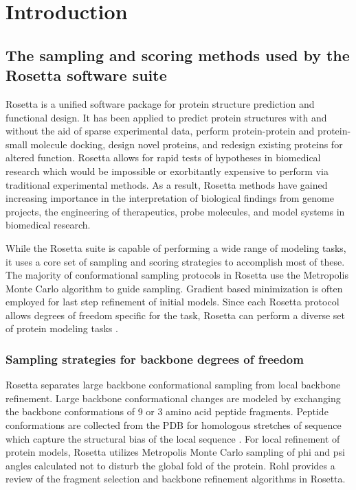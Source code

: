 \chapter{Introduction}
\label{chap:introduction}
\section{The sampling and scoring methods used by the Rosetta software suite}
\label{sec:rosetta_intro}
Rosetta is a unified software package for protein structure prediction and functional design.
It has been applied to predict protein structures with and without the aid of sparse experimental data, perform protein-protein and protein-small molecule docking, design novel proteins, and redesign existing proteins for altered function.
Rosetta allows for rapid tests of hypotheses in biomedical research which would be impossible or exorbitantly expensive to perform via traditional experimental methods.
As a result, Rosetta methods have gained increasing importance in the interpretation of biological findings from genome projects, the engineering of therapeutics, probe molecules, and model systems in biomedical research. 

While the Rosetta suite is capable of performing a wide range of modeling tasks, it uses a core set of sampling and scoring strategies to accomplish most of these. 
The majority of conformational sampling protocols in Rosetta use the Metropolis Monte Carlo algorithm to guide sampling.
Gradient based minimization is often employed for last step refinement of initial models.
Since each Rosetta protocol allows degrees of freedom specific for the task, Rosetta can perform a diverse set of protein modeling tasks  \citep{Wang:2007du}.

\subsection{Sampling strategies for backbone degrees of freedom}
Rosetta separates large backbone conformational sampling from local backbone refinement.
Large backbone conformational changes are modeled by exchanging the backbone conformations of 9 or 3 amino acid peptide fragments.
Peptide conformations are collected from the \ac{PDB} for homologous stretches of sequence  \citep{Simons:1997do} which capture the structural bias of the local sequence  \citep{Bystroff:1996vl}.
For local refinement of protein models, Rosetta utilizes Metropolis Monte Carlo sampling of phi and psi angles calculated not to disturb the global fold of the protein.
Rohl  \citep{Rohl:2004dh} provides a review of the fragment selection and backbone refinement algorithms in Rosetta. 

